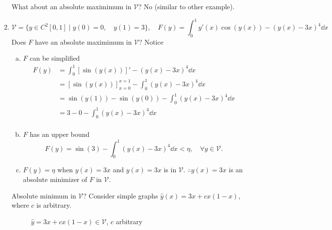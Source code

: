 \documentclass[12pt,twoside]{article}
\begin{document}
\begin{enumerate}
  What about an absolute maximimum in $\mathcal{V}$? No (similar to other
  example).
\item
  \begin{equation*}
    \mathcal{V} = \{y\in C^2[0,1] \;|\; y(0)=0,\quad y(1)=3\},\quad
    F(y)=\int_0^1y'(x)\cos(y(x))-{(y(x)-3x)}^4\dd{x}
  \end{equation*}
  Does $F$ have an absolute maximimum in $\mathcal{V}$? Notice
  \begin{enumerate}[(a)]
  \item $F$ can be simplified
    \begin{align*}
      F(y) &= \int_0^1[\sin(y(x))]'-{(y(x)-3x)}^4 \dd{x} \\
           &= [\sin(y(x))]_{x=0}^{x=1} - \int_0^1{(y(x)-3x)}^4\dd{x} \\
           &= \sin(y(1)) - \sin(y(0)) - \int_0^1{(y(x)-3x)}^4\dd{x} \\
           &= 3 - 0 - \int_0^1{(y(x)-3x)}^4\dd{x} \\
    \end{align*}
  \item $F$ has an upper bound
    \begin{equation*}
      F(y)=\sin(3) - \int_0^1{(y(x)-3x)}^4\dd{x} < \eta,\quad \forall y\in\mathcal{V}.
    \end{equation*}
  \item $F(y)=\eta$ when $y(x)=3x$ and $y(x)=3x$ is in $\mathcal{V}$.
    $\therefore y(x)=3x$ is an absolute minimizer of $F$ in $\mathcal{V}$.
  \end{enumerate}
  Absolute minimum in $\mathcal{V}$? Consider simple graphs
  $\hat{y}(x)=3x+cx(1-x)$, where $c$ is arbitrary.
\begin{figure}[ht]
    \centering
    \caption{$\hat{y}=3x+cx(1-x)\in\mathcal{V}$, $c$ arbitrary}
    \label{fig:v-equation-4}

\end{figure}
\end{enumerate}
\end{document}
